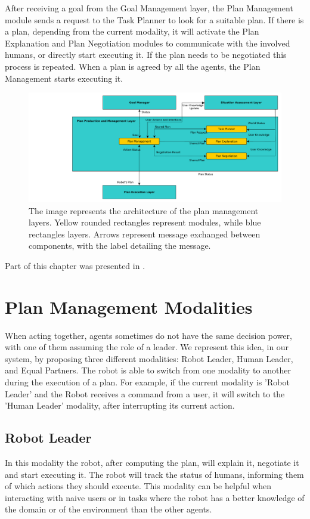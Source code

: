 After receiving a goal from the Goal Management layer, the Plan Management module sends a request to the Task Planner to look for a suitable plan. If there is a plan, depending from the current modality, it will activate the Plan Explanation and Plan Negotiation modules to communicate with the involved humans, or directly start executing it. If the plan needs to be negotiated this process is repeated. When a plan is agreed by all the agents, the Plan Management starts executing it. 

\begin{figure}[h!]
	\centering
	\includegraphics[clip,scale=0.6]{img/plan_management/architecture.pdf}
	\caption{The image represents the architecture of the plan management layers. Yellow rounded rectangles represent modules, while blue rectangles layers. Arrows represent message exchanged between components, with the label detailing the message. }
	\label{fig:plan_management-architecture}
\end{figure}


Part of this chapter was presented in \cite{Lallement2014,milliez2016using,fioreiser2014}.

\section{Plan Management Modalities}
\label{sec-plan_management-modalities}
When acting together, agents sometimes do not have the same decision power, with one of them assuming the role of a leader. We represent this idea, in our system, by proposing three different modalities: Robot Leader, Human Leader, and Equal Partners. The robot is able to switch from one modality to another during the execution of a plan. For example, if the current modality is 'Robot Leader' and the Robot receives a command from a user, it will switch to the 'Human Leader' modality, after interrupting its current action.

\subsection{Robot Leader}
In this modality the robot, after computing the plan, will explain it, negotiate it and start executing it.
The robot will track the status of humans, informing them of which actions they should execute. This modality can be helpful when interacting with  naive users or in tasks where the robot has a better knowledge of the
domain or of the environment than the other agents.

